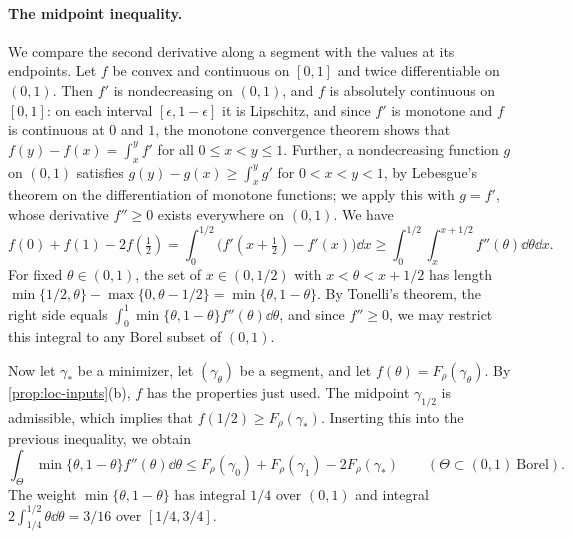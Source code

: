 \paragraph{The midpoint inequality.}
We compare the second derivative along a segment with the values at its
endpoints. Let $f$ be convex and continuous on $[0,1]$ and twice
differentiable on $(0,1)$. Then $f'$ is nondecreasing on $(0,1)$, and $f$ is
absolutely continuous on $[0,1]$: on each interval $[\epsilon,1-\epsilon]$ it
is Lipschitz, and since $f'$ is monotone and $f$ is continuous at $0$ and $1$,
the monotone convergence theorem shows that $f(y)-f(x)=\int_x^yf'$ for all
$0\le x<y\le1$. Further, a nondecreasing function $g$ on $(0,1)$ satisfies
$g(y)-g(x)\ge\int_x^yg'$ for $0<x<y<1$, by Lebesgue's theorem on the
differentiation of monotone functions; we apply this with $g=f'$, whose
derivative $f''\ge0$ exists everywhere on $(0,1)$. We have
\[
 f(0)+f(1)-2f(\tfrac12)
 =\int_0^{1/2}\bigl(f'(x+\tfrac12)-f'(x)\bigr)\dd x
 \ge\int_0^{1/2}\!\!\int_x^{x+1/2}f''(\theta)\dd\theta\dd x .
\]
For fixed $\theta\in(0,1)$, the set of $x\in(0,1/2)$ with $x<\theta<x+1/2$
has length $\min\{1/2,\theta\}-\max\{0,\theta-1/2\}=\min\{\theta,1-\theta\}$.
By Tonelli's theorem, the right side equals
$\int_0^1\min\{\theta,1-\theta\}f''(\theta)\dd\theta$, and since $f''\ge0$,
we may restrict this integral to any Borel subset of $(0,1)$.

Now let $\gamma_*$ be a minimizer, let $(\gamma_\theta)$ be a segment, and let
$f(\theta)=F_\rho(\gamma_\theta)$. By \cref{prop:loc-inputs}(b), $f$ has the
properties just used. The midpoint $\gamma_{1/2}$ is admissible, which implies that
$f(1/2)\ge F_\rho(\gamma_*)$. Inserting this into the previous inequality, we
obtain
\begin{equation}\label{eq:loc-midpoint}
 \int_\Theta\min\{\theta,1-\theta\}f''(\theta)\dd\theta
 \le F_\rho(\gamma_0)+F_\rho(\gamma_1)-2F_\rho(\gamma_*)
 \qquad(\Theta\subset(0,1)\ \text{Borel}).
\end{equation}
The weight $\min\{\theta,1-\theta\}$ has integral $1/4$ over $(0,1)$ and
integral $2\int_{1/4}^{1/2}\theta\dd\theta=3/16$ over $[1/4,3/4]$.


